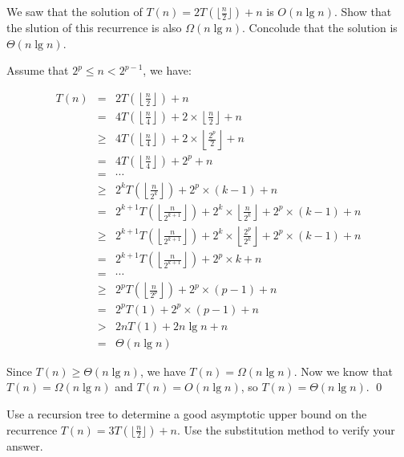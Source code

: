 

We saw that the solution of $T(n) = 2T(\lfloor\frac{n}{2}\rfloor) + n$ is $O(n\lg n)$. Show that the slution of this recurrence is also $\Omega(n \lg n)$.
Concolude that the solution is $\Theta(n \lg n)$.

\answer

Assume that $2^p \leq n < 2^{p-1}$, we have:

\begin{eqnarray*}
T(n) &=& 2T\left(\left\lfloor\frac{n}{2}\right\rfloor\right) + n\\
&=& 4T\left(\left\lfloor\frac{n}{4}\right\rfloor\right) + 2\times\left\lfloor\frac{n}{2}\right\rfloor + n\\
&\geq& 4T\left(\left\lfloor\frac{n}{4}\right\rfloor\right) + 2\times\left\lfloor\frac{2^p}{2}\right\rfloor + n\\
&=& 4T\left(\left\lfloor\frac{n}{4}\right\rfloor\right) + 2^p + n\\
&=& \cdots\\
&\geq& 2^k T\left(\left\lfloor\frac{n}{2^k}\right\rfloor\right) + 2^p \times (k - 1) + n\\
&=& 2^{k + 1} T\left(\left\lfloor\frac{n}{2^{k + 1}}\right\rfloor\right) + 2^k\times\left\lfloor\frac{n}{2^k}\right\rfloor  +2^p \times (k - 1) + n\\
&\geq& 2^{k + 1} T\left(\left\lfloor\frac{n}{2^{k + 1}}\right\rfloor\right) + 2^k\times\left\lfloor\frac{2^p}{2^k}\right\rfloor  +2^p \times (k - 1) + n\\
&=& 2^{k + 1} T\left(\left\lfloor\frac{n}{2^{k + 1}}\right\rfloor\right)  +2^p \times k + n\\
&=& \cdots\\
&\geq& 2^p T\left(\left\lfloor\frac{n}{2^p}\right\rfloor\right) + 2^p \times (p - 1) + n\\
&=& 2^p T(1) + 2^p \times (p - 1) + n\\
&>& 2n T(1) + 2n \lg n + n\\
&=& \Theta(n\lg n)
\end{eqnarray*}

Since $T(n)\geq \Theta(n\lg n)$, we have $T(n) = \Omega(n \lg n)$. Now we know that $T(n) = \Omega(n\lg n)$ and $T(n) = O(n \lg n)$, so $T(n) = \Theta(n\lg n)$.
\qed


Use a recursion tree to determine a good asymptotic upper bound on the recurrence $T(n) = 3T(\lfloor\frac{n}{2}\rfloor) + n$. Use the substitution method to verify your answer.

